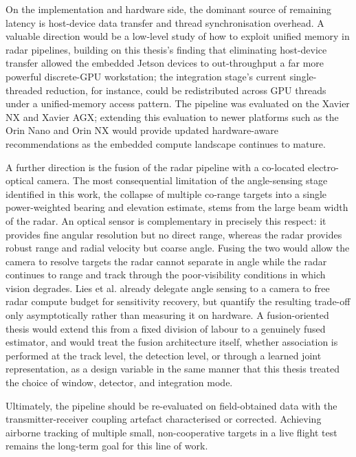 On the implementation and hardware side, the dominant source of remaining latency is 
host-device data transfer and thread synchronisation overhead. A valuable direction 
would be a low-level study of how to exploit unified memory in radar pipelines, 
building on this thesis's finding that eliminating host-device transfer allowed the 
embedded Jetson devices to out-throughput a far more powerful discrete-GPU workstation; 
the integration stage's current single-threaded reduction, for instance, could be 
redistributed across GPU threads under a unified-memory access pattern. The pipeline 
was evaluated on the Xavier NX and Xavier AGX; extending this evaluation to newer 
platforms such as the Orin Nano and Orin NX would provide updated hardware-aware 
recommendations as the embedded compute landscape continues to mature.

A further direction is the fusion of the radar pipeline with a co-located electro-
optical camera. The most consequential limitation of the angle-sensing stage identified 
in this work, the collapse of multiple co-range targets into a single power-weighted 
bearing and elevation estimate, stems from the large beam width of the radar. 
An optical sensor is complementary in precisely this respect: 
it provides fine angular resolution but no direct range, whereas the radar provides 
robust range and radial velocity but coarse angle. Fusing the two would allow the 
camera to resolve targets the radar cannot separate in angle while the radar continues 
to range and track through the poor-visibility conditions in which vision degrades. 
Lies et al. \cite{Lies2020} already delegate angle sensing to a camera to free radar 
compute budget for sensitivity recovery, but quantify the resulting trade-off only 
asymptotically rather than measuring it on hardware. A fusion-oriented thesis would 
extend this from a fixed division of labour to a genuinely fused estimator, and would 
treat the fusion architecture itself, whether association is performed at the track 
level, the detection level, or through a learned joint representation, as a design 
variable in the same manner that this thesis treated the choice of window, detector, 
and integration mode. 

Ultimately, the pipeline should be re-evaluated on field-obtained data with the 
transmitter-receiver coupling artefact characterised or corrected. Achieving airborne 
tracking of multiple small, non-cooperative targets in a live flight test remains the 
long-term goal for this line of work.